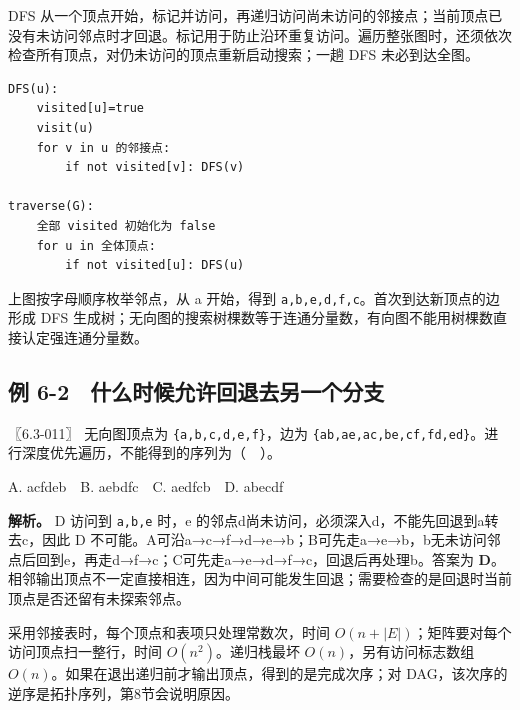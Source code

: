 DFS 从一个顶点开始，标记并访问，再递归访问尚未访问的邻接点；当前顶点已没有未访问邻点时才回退。标记用于防止沿环重复访问。遍历整张图时，还须依次检查所有顶点，对仍未访问的顶点重新启动搜索；一趟 DFS 未必到达全图。

\par\medskip\noindent
\begin{minipage}{\linewidth}
\begin{verbatim}
DFS(u):
    visited[u]=true
    visit(u)
    for v in u 的邻接点:
        if not visited[v]: DFS(v)

traverse(G):
    全部 visited 初始化为 false
    for u in 全体顶点:
        if not visited[u]: DFS(u)
\end{verbatim}
\end{minipage}\par\medskip

上图按字母顺序枚举邻点，从 a 开始，得到 \allowbreak{}\texttt{a,}\allowbreak{}\texttt{b,}\allowbreak{}\texttt{e,}\allowbreak{}\texttt{d,}\allowbreak{}\texttt{f,}\allowbreak{}\texttt{c}。首次到达新顶点的边形成 DFS 生成树；无向图的搜索树棵数等于连通分量数，有向图不能用树棵数直接认定强连通分量数。

\subsection{例 6-2　什么时候允许回退去另一个分支}\label{ds-ex6-2}

\noindent{}〖6.3-011〗 无向图顶点为 \allowbreak{}\texttt{\{a,}\allowbreak{}\texttt{b,}\allowbreak{}\texttt{c,}\allowbreak{}\texttt{d,}\allowbreak{}\texttt{e,}\allowbreak{}\texttt{f\}}，边为 \allowbreak{}\texttt{\{ab,}\allowbreak{}\texttt{ae,}\allowbreak{}\texttt{ac,}\allowbreak{}\texttt{be,}\allowbreak{}\texttt{cf,}\allowbreak{}\texttt{fd,}\allowbreak{}\texttt{ed\}}。进行深度优先遍历，不能得到的序列为（　）。

A. acfdeb　B. aebdfc　C. aedfcb　D. abecdf


\textbf{解析。} D 访问到 \allowbreak{}\texttt{a,}\allowbreak{}\texttt{b,}\allowbreak{}\texttt{e} 时，e 的邻点d尚未访问，必须深入d，不能先回退到a转去c，因此 D 不可能。A可沿a→c→f→d→e→b；B可先走a→e→b，b无未访问邻点后回到e，再走d→f→c；C可先走a→e→d→f→c，回退后再处理b。答案为 \textbf{D}。相邻输出顶点不一定直接相连，因为中间可能发生回退；需要检查的是回退时当前顶点是否还留有未探索邻点。

采用邻接表时，每个顶点和表项只处理常数次，时间 \(O(n+|E|)\)；矩阵要对每个访问顶点扫一整行，时间 \(O(n^2)\)。递归栈最坏 \(O(n)\)，另有访问标志数组 \(O(n)\)。如果在退出递归前才输出顶点，得到的是完成次序；对 DAG，该次序的逆序是拓扑序列，第8节会说明原因。

